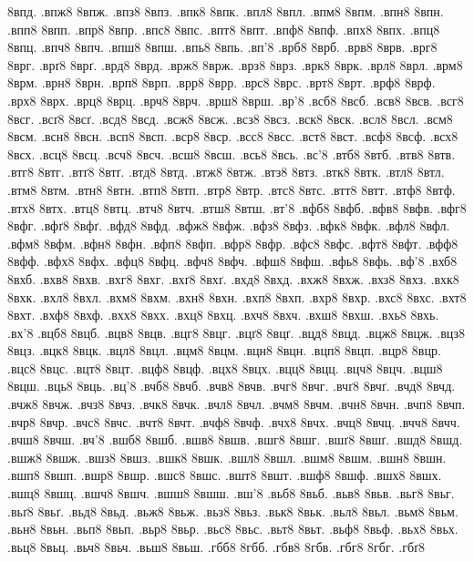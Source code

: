 {8впд.
.впж8
8впж.
.впз8
8впз.
.впк8
8впк.
.впл8
8впл.
.впм8
8впм.
.впн8
8впн.
.впп8
8впп.
.впр8
8впр.
.впс8
8впс.
.впт8
8впт.
.впф8
8впф.
.впх8
8впх.
.впц8
8впц.
.впч8
8впч.
.впш8
8впш.
.впь8
8впь.
.вп'8
.врб8
8врб.
.врв8
8врв.
.врг8
8врг.
.врґ8
8врґ.
.врд8
8врд.
.врж8
8врж.
.врз8
8врз.
.врк8
8врк.
.врл8
8врл.
.врм8
8врм.
.врн8
8врн.
.врп8
8врп.
.врр8
8врр.
.врс8
8врс.
.врт8
8врт.
.врф8
8врф.
.врх8
8врх.
.врц8
8врц.
.врч8
8врч.
.врш8
8врш.
.вр'8
.всб8
8всб.
.всв8
8всв.
.всг8
8всг.
.всґ8
8всґ.
.всд8
8всд.
.всж8
8всж.
.всз8
8всз.
.вск8
8вск.
.всл8
8всл.
.всм8
8всм.
.всн8
8всн.
.всп8
8всп.
.вср8
8вср.
.всс8
8всс.
.вст8
8вст.
.всф8
8всф.
.всх8
8всх.
.всц8
8всц.
.всч8
8всч.
.всш8
8всш.
.всь8
8всь.
.вс'8
.втб8
8втб.
.втв8
8втв.
.втг8
8втг.
.втґ8
8втґ.
.втд8
8втд.
.втж8
8втж.
.втз8
8втз.
.втк8
8втк.
.втл8
8втл.
.втм8
8втм.
.втн8
8втн.
.втп8
8втп.
.втр8
8втр.
.втс8
8втс.
.втт8
8втт.
.втф8
8втф.
.втх8
8втх.
.втц8
8втц.
.втч8
8втч.
.втш8
8втш.
.вт'8
.вфб8
8вфб.
.вфв8
8вфв.
.вфг8
8вфг.
.вфґ8
8вфґ.
.вфд8
8вфд.
.вфж8
8вфж.
.вфз8
8вфз.
.вфк8
8вфк.
.вфл8
8вфл.
.вфм8
8вфм.
.вфн8
8вфн.
.вфп8
8вфп.
.вфр8
8вфр.
.вфс8
8вфс.
.вфт8
8вфт.
.вфф8
8вфф.
.вфх8
8вфх.
.вфц8
8вфц.
.вфч8
8вфч.
.вфш8
8вфш.
.вфь8
8вфь.
.вф'8
.вхб8
8вхб.
.вхв8
8вхв.
.вхг8
8вхг.
.вхґ8
8вхґ.
.вхд8
8вхд.
.вхж8
8вхж.
.вхз8
8вхз.
.вхк8
8вхк.
.вхл8
8вхл.
.вхм8
8вхм.
.вхн8
8вхн.
.вхп8
8вхп.
.вхр8
8вхр.
.вхс8
8вхс.
.вхт8
8вхт.
.вхф8
8вхф.
.вхх8
8вхх.
.вхц8
8вхц.
.вхч8
8вхч.
.вхш8
8вхш.
.вхь8
8вхь.
.вх'8
.вцб8
8вцб.
.вцв8
8вцв.
.вцг8
8вцг.
.вцґ8
8вцґ.
.вцд8
8вцд.
.вцж8
8вцж.
.вцз8
8вцз.
.вцк8
8вцк.
.вцл8
8вцл.
.вцм8
8вцм.
.вцн8
8вцн.
.вцп8
8вцп.
.вцр8
8вцр.
.вцс8
8вцс.
.вцт8
8вцт.
.вцф8
8вцф.
.вцх8
8вцх.
.вцц8
8вцц.
.вцч8
8вцч.
.вцш8
8вцш.
.вць8
8вць.
.вц'8
.вчб8
8вчб.
.вчв8
8вчв.
.вчг8
8вчг.
.вчґ8
8вчґ.
.вчд8
8вчд.
.вчж8
8вчж.
.вчз8
8вчз.
.вчк8
8вчк.
.вчл8
8вчл.
.вчм8
8вчм.
.вчн8
8вчн.
.вчп8
8вчп.
.вчр8
8вчр.
.вчс8
8вчс.
.вчт8
8вчт.
.вчф8
8вчф.
.вчх8
8вчх.
.вчц8
8вчц.
.вчч8
8вчч.
.вчш8
8вчш.
.вч'8
.вшб8
8вшб.
.вшв8
8вшв.
.вшг8
8вшг.
.вшґ8
8вшґ.
.вшд8
8вшд.
.вшж8
8вшж.
.вшз8
8вшз.
.вшк8
8вшк.
.вшл8
8вшл.
.вшм8
8вшм.
.вшн8
8вшн.
.вшп8
8вшп.
.вшр8
8вшр.
.вшс8
8вшс.
.вшт8
8вшт.
.вшф8
8вшф.
.вшх8
8вшх.
.вшц8
8вшц.
.вшч8
8вшч.
.вшш8
8вшш.
.вш'8
.вьб8
8вьб.
.вьв8
8вьв.
.вьг8
8вьг.
.вьґ8
8вьґ.
.вьд8
8вьд.
.вьж8
8вьж.
.вьз8
8вьз.
.вьк8
8вьк.
.вьл8
8вьл.
.вьм8
8вьм.
.вьн8
8вьн.
.вьп8
8вьп.
.вьр8
8вьр.
.вьс8
8вьс.
.вьт8
8вьт.
.вьф8
8вьф.
.вьх8
8вьх.
.вьц8
8вьц.
.вьч8
8вьч.
.вьш8
8вьш.
.гбб8
8гбб.
.гбв8
8гбв.
.гбг8
8гбг.
.гбґ8
}
